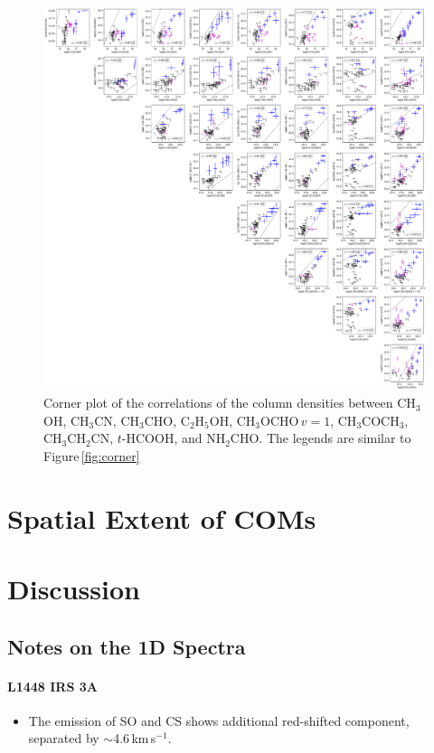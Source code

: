 \documentclass[twocolumn]{aastex62}
\newcommand{\kms}{\mbox{\,km\,s$^{-1}$}}
\newcommand{\methylformatev}{\mbox{CH$_{3}$OCHO\,$v=1$}}
\newcommand{\methanol}{\mbox{CH$_{3}$OH}}
\newcommand{\acetone}{\mbox{CH$_{3}$COCH$_{3}$}}
\newcommand{\ethanol}{\mbox{C$_{2}$H$_{5}$OH}}
\newcommand{\acetaldehyde}{\mbox{CH$_{3}$CHO}}
\newcommand{\ethylcyanide}{\mbox{CH$_{3}$CH$_{2}$CN}}
\newcommand{\methylcyanide}{\mbox{CH$_{3}$CN}}
\newcommand{\formamide}{\mbox{NH$_{2}$CHO}}
\begin{document}
\begin{figure}[htbp!]
  \centering
  \includegraphics[width=\textwidth]{corner_Ncol_correlations_minor.pdf}
  \caption{Corner plot of the correlations of the column densities between \methanol, \methylcyanide, \acetaldehyde, \ethanol, \methylformatev, \acetone, \ethylcyanide, $t$-HCOOH, and \formamide.  The legends are similar to Figure\,\ref{fig:corner}}
  \label{fig:corner_minor}
\end{figure}

\section{Spatial Extent of COMs}
\section{Discussion}
\subsection{Notes on the 1D Spectra}
\paragraph{L1448 IRS 3A}
\begin{itemize}
  \item The emission of SO and CS shows additional red-shifted component, separated by $\sim$4.6\kms.
\end{itemize}
\end{document}
